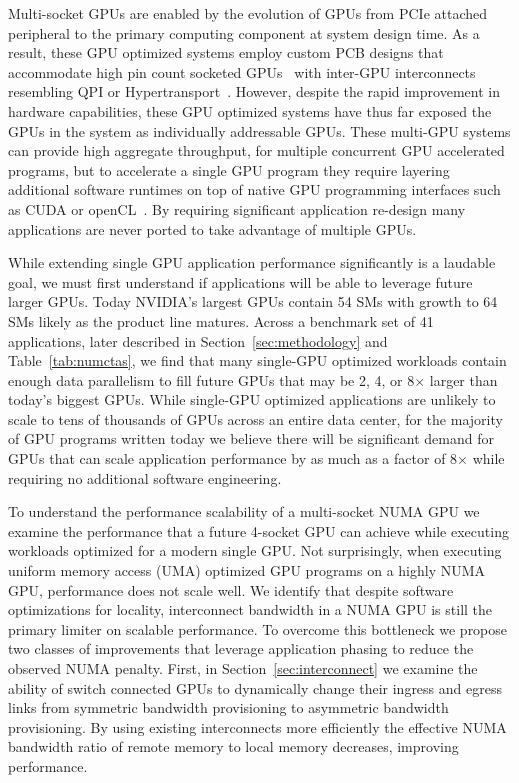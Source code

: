 Multi-socket GPUs are enabled by the evolution of GPUs from PCIe attached 
peripheral to the primary computing component at system design time.  As a 
result, these GPU optimized systems employ custom PCB designs that accommodate 
high pin count socketed GPUs~\cite{dgx} with inter-GPU interconnects resembling 
QPI or Hypertransport~\cite{NVLINK,INTELQPI,AMDHT}.  However, despite the rapid 
improvement in hardware capabilities, these GPU optimized systems have 
thus far exposed the GPUs in the system as individually addressable GPUs. These
multi-GPU systems can provide high aggregate throughput, for multiple concurrent
GPU accelerated programs, but to accelerate a single GPU program they
require layering additional software runtimes on top of native GPU programming 
interfaces such as CUDA or openCL~\cite{CUDA,OPENCL}. By requiring significant
application re-design many applications are never ported to take advantage
of multiple GPUs.

While extending single GPU application performance significantly is a laudable
goal, we must first understand if applications will be able to leverage future
larger GPUs.  Today NVIDIA's largest GPUs contain 54 SMs with growth to 64 SMs
likely as the product line matures. Across a benchmark set of 41 applications,
later described in Section~\ref{sec:methodology} and Table~\ref{tab:numctas},
we find that many single-GPU optimized workloads contain enough data 
parallelism 
to fill future GPUs that may be 2, 4, or 8$\times$ larger than today's biggest
GPUs.  While single-GPU optimized applications are unlikely to scale to tens
of thousands of GPUs across an entire data center, for the majority of GPU
programs written today we believe there will be significant demand for GPUs that
can scale application performance by as much as a factor of 8$\times$ 
while requiring no additional software engineering.

To understand the performance scalability of a multi-socket NUMA GPU we examine 
the performance that a future 4-socket GPU can achieve while executing 
workloads optimized for a modern single GPU. Not surprisingly, when executing 
uniform memory access (UMA) optimized GPU programs on a highly NUMA GPU, 
performance does not scale well.  We identify that despite software 
optimizations for locality, interconnect bandwidth in a NUMA GPU is still the 
primary limiter on scalable performance.  To overcome this bottleneck we propose 
two classes of improvements that leverage application phasing to reduce the 
observed NUMA penalty.  First, in Section~\ref{sec:interconnect} we examine the 
ability of switch connected GPUs to dynamically change their ingress and egress 
links from symmetric bandwidth provisioning to asymmetric bandwidth 
provisioning.  By using existing interconnects more efficiently the effective 
NUMA bandwidth ratio of remote memory to local memory decreases, improving 
performance.


